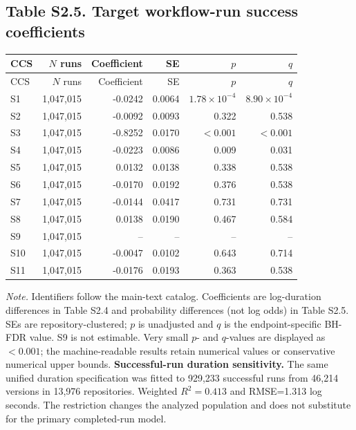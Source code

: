 \documentclass{article}
\begin{document}
\subsection*{Table S2.5. Target workflow-run success coefficients}
\footnotesize\begin{longtable}{lrrrrr}
\toprule CCS & $N$ runs & Coefficient & SE & $p$ & $q$ \\\midrule\endfirsthead
\toprule CCS & $N$ runs & Coefficient & SE & $p$ & $q$ \\\midrule\endhead
S1 & 1,047,015 & -0.0242 & 0.0064 & $1.78\times10^{-4}$ & $8.90\times10^{-4}$ \\
S2 & 1,047,015 & -0.0092 & 0.0093 & 0.322 & 0.538 \\
S3 & 1,047,015 & -0.8252 & 0.0170 & $<0.001$ & $<0.001$ \\
S4 & 1,047,015 & -0.0223 & 0.0086 & 0.009 & 0.031 \\
S5 & 1,047,015 & 0.0132 & 0.0138 & 0.338 & 0.538 \\
S6 & 1,047,015 & -0.0170 & 0.0192 & 0.376 & 0.538 \\
S7 & 1,047,015 & -0.0144 & 0.0417 & 0.731 & 0.731 \\
S8 & 1,047,015 & 0.0138 & 0.0190 & 0.467 & 0.584 \\
S9 & 1,047,015 & -- & -- & -- & -- \\
S10 & 1,047,015 & -0.0047 & 0.0102 & 0.643 & 0.714 \\
S11 & 1,047,015 & -0.0176 & 0.0193 & 0.363 & 0.538 \\
\bottomrule\end{longtable}
\noindent\textit{Note.} Identifiers follow the main-text catalog. Coefficients are log-duration differences in Table S2.4 and probability differences (not log odds) in Table S2.5. SEs are repository-clustered; $p$ is unadjusted and $q$ is the endpoint-specific BH-FDR value. S9 is not estimable. Very small $p$- and $q$-values are displayed as $<0.001$; the machine-readable results retain numerical values or conservative numerical upper bounds.
\medskip\noindent\textbf{Successful-run duration sensitivity.} The same unified duration specification was fitted to 929,233 successful runs from 46,214 versions in 13,976 repositories. Weighted $R^2=0.413$ and RMSE=1.313 log seconds. The restriction changes the analyzed population and does not substitute for the primary completed-run model.
\end{document}
